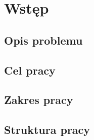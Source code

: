
\chapter*{Wstęp}\label{ch:admission}

\section*{Opis problemu}\label{sec:admission:problem-description}

\section*{Cel pracy}\label{sec:admission:thesis-goal}

\todo{}

\section*{Zakres pracy}\label{sec:admission:scope-of-work}

\todo{}

\section*{Struktura pracy}\label{sec:admission:thesis-structure}

\thispagestyle{normal}
